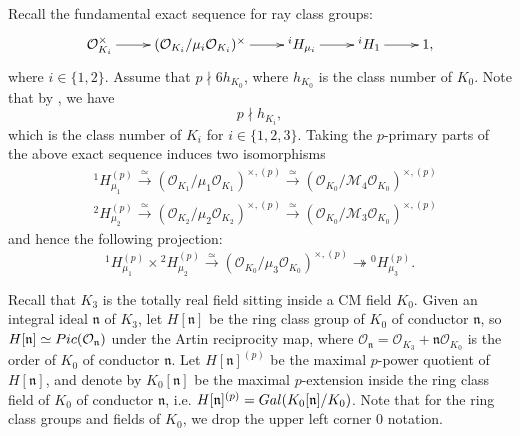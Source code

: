 \documentclass[10pt,letterpaper]{amsart}
\theoremstyle{plain}
\theoremstyle{definition}
\theoremstyle{definition}
\theoremstyle{plain}
\theoremstyle{plain}
\theoremstyle{plain}
\theoremstyle{remark}
\numberwithin{equation}{section}
\newcommand{\fkn}{\mathfrak{n}}
\def\cM{\mathcal M}
\def\cO{\mathcal O}
\begin{document}
Recall the fundamental exact sequence for ray class groups:
\[
\xymatrix{
\cO_{K_i}^\times\ar[r]&(\cO_{K_i}/\mu_i\cO_{K_i})^\times\ar[r]&^{i}H_{\mu_i}\ar[r]& ^{i}H_1\ar[r]&1,
}
\]
where $i\in\{1,2\}$. Assume that $p\nmid 6h_{K_0}$, where $h_{K_0}$ is the class number of $K_0$. Note that by \cite[Thm.\,74]{Frohlich_Taylor_1991}, we have
\[p\nmid h_{K_i},\]
which is the class number of $K_i$ for $i\in\{1,2,3\}$. Taking the $p$-primary parts of the above exact sequence induces two isomorphisms
\begin{align*}
    &^{1}H_{\mu_1}^{(p)}\xrightarrow{\simeq} (\cO_{K_1}/\mu_1\cO_{K_1})^{\times,(p)} \xrightarrow{\simeq} (\cO_{K_0}/\cM_4\cO_{K_0})^{\times,(p)} \\
   & ^{2}H_{\mu_2}^{(p)}\xrightarrow{\simeq} (\cO_{K_2}/\mu_2\cO_{K_2})^{\times,(p)} \xrightarrow{\simeq} (\cO_{K_0}/\cM_3\cO_{K_0})^{\times,(p)}
\end{align*}
and hence the following projection:
\begin{equation}\label{eq:H-m-decompose}
    ^{1}H_{\mu_1}^{(p)}\times {^{2}H}_{\mu_2}^{(p)} \xrightarrow{\simeq} (\cO_{K_0}/\mu_3\cO_{K_0})^{\times,(p)} \twoheadrightarrow {^{0}H_{\mu_3}^{(p)}}.
\end{equation}



Recall that $K_3$ is the totally real field sitting inside a CM field $K_0$. Given an integral ideal $\fkn$ of $K_3$, let $H[\fkn]$ be the ring class group of $K_0$ of conductor $\fkn$, so 
$H[\fkn]\simeq{\rm Pic}(\cO_\fkn)$ under the Artin reciprocity map, where $\cO_\fkn=\cO_{K_3}+\fkn\cO_{K_0}$ is the order of $K_0$ of conductor $\fkn$. Let $H[\fkn]^{(p)}$ be the maximal $p$-power quotient of $H[\fkn]$, and denote by $K_0[\fkn]$ be the maximal $p$-extension inside the ring class field of $K_0$ of conductor $\fkn$, i.e. $H[\fkn]^{(p)}={\rm Gal}(K_0[\fkn]/K_0)$. Note that for the ring class groups and fields of $K_0$, we drop the upper left corner $0$ notation.
\end{document}
